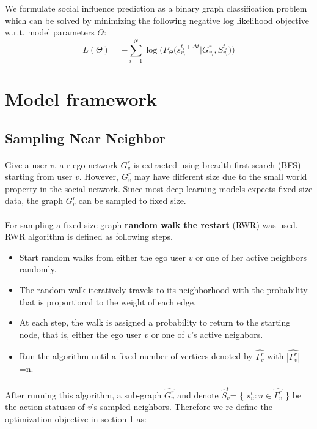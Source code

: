 We formulate social influence prediction as a binary graph classification problem which can be solved by minimizing the following negative log likelihood objective w.r.t. model parameters $\Theta$: $$L(\Theta) = - \sum_{i=1}^N \log \big( P_\Theta \big( s_{v_i}^{t_i+\Delta t} \vert G_{v_i}^r, S_{v_i}^{t_i}\big)\big)$$

\section{Model framework}
\subsection{Sampling Near Neighbor}

\paragraph{} Give a user $v$, a r-ego network $G_v^r$ is extracted using breadth-first search (BFS) starting from 
user $v$. However, $G_v^r$ may have different size due to the small world property in the social network. Since most
deep learning models expects fixed size data, the graph $G_v^r$ can be sampled to fixed size.
\paragraph{} For sampling a fixed size graph \textbf{random walk the restart} (RWR) was used. RWR algorithm is defined as
following steps.

\begin{itemize}
    \item Start random walks from either the ego user $v$ or one of her active neighbors randomly.
    \item The random walk iteratively travels to its neighborhood with the probability that is 
    proportional to the weight of each edge.
    \item At each step, the walk is assigned a probability to return to the starting node, that is, 
    either the ego user $v$ or one of $v$’s active neighbors.
    \item Run the algorithm until a fixed number of vertices denoted by $\hat{\Gamma_v^r}$ with $\hat{|\Gamma_v^r|}$=n. 
\end{itemize}

\paragraph{} After running this algorithm, a sub-graph $\hat{G_v^r}$ and denote $\hat{S}_v^t$=
\{ $s_u^t :u \in \hat{\Gamma_v^r}$ \} be the action statuses of $v$'s sampled neighbors. Therefore we re-define the optimization
objective in section 1 as:

